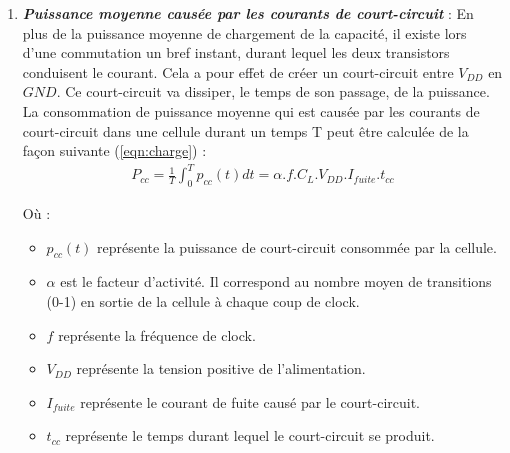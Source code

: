 \documentclass[10pt, oneside, a4paper]{article}
\begin{document}
\begin{enumerate}
\vspace{-0.2 cm}\item \textbf{\textit{Puissance moyenne causée par les courants de court-circuit}} : En plus de la puissance moyenne de chargement de la capacité, il existe lors d'une commutation un bref instant, durant lequel les deux transistors conduisent le courant. Cela a pour effet de créer un court-circuit entre $V_{DD}$ en $GND$. Ce court-circuit va dissiper, le temps de son passage, de la puissance. La consommation de puissance moyenne qui est causée par les courants de court-circuit dans une cellule durant un temps T peut être calculée de la façon suivante (\ref{eqn:charge}) :
\begin{gather}
	P_{cc} = \frac{1}{T}\int_{0}^{T}p_{cc}(t)dt=\alpha.f.C_{L}.V_{DD}.I_{fuite}.t_{cc}
\end{gather}

Où : 
\begin{itemize}
\item $p_{cc}(t)$ représente la puissance de court-circuit consommée par la cellule.
\item $\alpha$ est le facteur d'activité. Il correspond au nombre moyen de transitions (0-1) en sortie de la cellule à chaque coup de clock.
\item $f$ représente la fréquence de clock.
\item $V_{DD}$ représente la tension positive de l'alimentation.
\item $I_{fuite}$ représente le courant de fuite causé par le court-circuit.
\item $t_{cc}$ représente le temps durant lequel le court-circuit se produit.
\end{itemize}

\end{enumerate}

\hspace{-0.5 cm}
\end{document}
